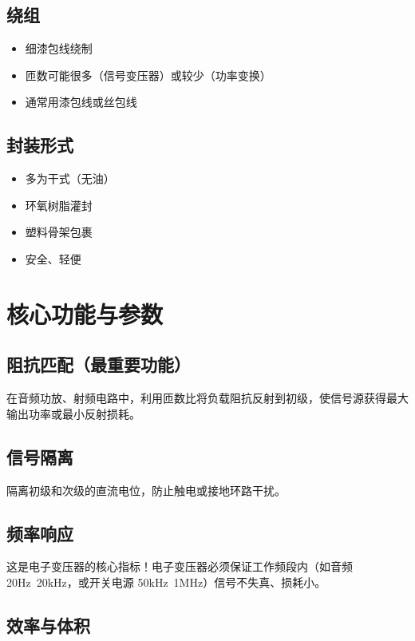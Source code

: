 \documentclass[12pt,UTF8]{ctexbook}
\begin{document}
\section{绕组}

\begin{itemize}
    \item 细漆包线绕制
    \item 匝数可能很多（信号变压器）或较少（功率变换）
    \item 通常用漆包线或丝包线
\end{itemize}

\section{封装形式}

\begin{itemize}
    \item 多为干式（无油）
    \item 环氧树脂灌封
    \item 塑料骨架包裹
    \item 安全、轻便
\end{itemize}

\chapter{核心功能与参数}
\label{chap:electronic_params}

\section{阻抗匹配（最重要功能）}

在音频功放、射频电路中，利用匝数比将负载阻抗反射到初级，使信号源获得最大输出功率或最小反射损耗。

\section{信号隔离}

隔离初级和次级的直流电位，防止触电或接地环路干扰。

\section{频率响应}

这是电子变压器的核心指标！电子变压器必须保证工作频段内（如音频 20Hz~20kHz，或开关电源 50kHz~1MHz）信号不失真、损耗小。

\section{效率与体积}
\end{document}

